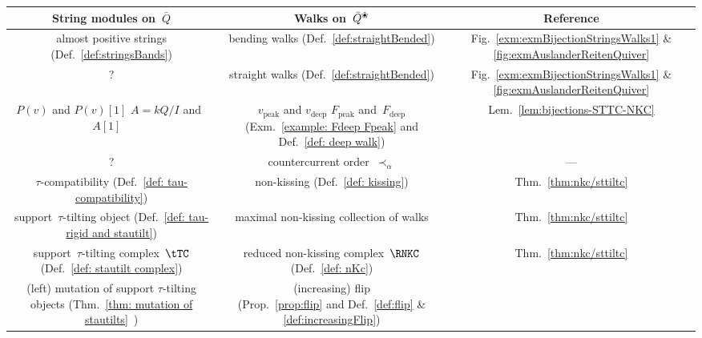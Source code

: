 \documentclass{memo-l}
\theoremstyle{definition}
\newcommand{\blossom}{^\text{\ding{96}}} %
\newcommand{\peak}{\mathrm{peak}} %
\newcommand{\deep}{\mathrm{deep}} %
\begin{document}
\captionsetup{width=1.4\textwidth}
{
	\hspace{1cm}
	\begin{minipage}{18cm}
	\vspace*{-1cm}
	\noindent
	\renewcommand{\arraystretch}{1.2}
	\begin{tabular}{|c|c|c|}
    \hline
    String modules on~$\bar Q$ &
    Walks on~$\bar Q\blossom$  &
    Reference
    \\ \hline \hline
    almost positive strings (Def.~\ref{def:stringsBands}) &
    bending walks (Def.~\ref{def:straightBended}) &
    Fig.~\ref{exm:exmBijectionStringsWalks1} \& \ref{fig:exmAuslanderReitenQuiver}
    \\ \hline
    ?\footnotemark[1] &
    straight walks (Def.~\ref{def:straightBended}) &
    Fig.~\ref{exm:exmBijectionStringsWalks1} \& \ref{fig:exmAuslanderReitenQuiver}
    \\ \hline
    \multiLinesBox{$P(v)$ and $P(v)[1]$ \\ $A=kQ/I$ and~$A[1]$ \\ ~} &
    \multiLinesBox{$v_\peak$ and $v_\deep$ \\ $F_\peak$ and~$F_\deep$ \\ (Exm.~\ref{example: Fdeep Fpeak} and Def.~\ref{def: deep walk})} &
    Lem.~\ref{lem:bijections-STTC-NKC}
    \\ \hline
    ?\footnotemark[2] &
    countercurrent order~$\prec_\alpha$ &
    ---
    \\ \hline
    $\tau$-compatibility (Def.~\ref{def: tau-compatibility}) &
    non-kissing (Def.~\ref{def: kissing}) &
    Thm.~\ref{thm:nkc/sttiltc}
    \\ \hline
    support~$\tau$-tilting object (Def.~\ref{def: tau-rigid and stautilt}) &
    maximal non-kissing collection of walks &
    Thm.~\ref{thm:nkc/sttiltc}
    \\ \hline
    support~$\tau$-tilting complex~$\tTC$ (Def.~\ref{def: stautilt complex}) &
    reduced non-kissing complex~$\RNKC$ (Def.~\ref{def: nKc}) &
    Thm.~\ref{thm:nkc/sttiltc}
    \\ \hline
    \multiLinesBox{(left) mutation of support \\ $\tau$-tilting objects (Thm.~\ref{thm: mutation of stautilts}~\cite{AdachiIyamaReiten})} &
    \multiLinesBox{(increasing) flip \\ (Prop.~\ref{prop:flip} and Def.~\ref{def:flip} \& \ref{def:increasingFlip})} &

\end{tabular}
\end{minipage}}
\end{document}
